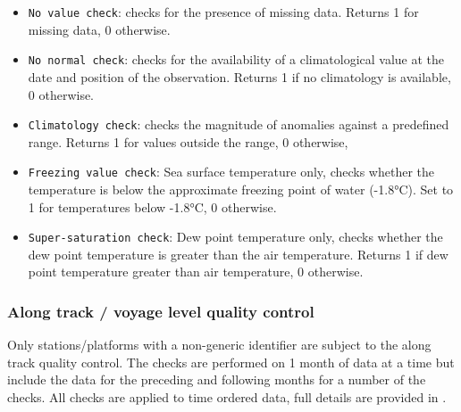 \begin{itemize}[resume]
\item \texttt{No value check}: checks for the presence of missing data. Returns 1 for missing data, 0 otherwise.
\item \texttt{No normal check}: checks for the availability of a climatological value at the date and position of the observation. Returns 1 if no climatology is available, 0 otherwise.
\item \texttt{Climatology check}: checks the magnitude of anomalies against a predefined range. Returns 1 for values outside the range, 0 otherwise,
\item \texttt{Freezing value check}: Sea surface temperature only, checks whether the temperature is below the approximate freezing point of water (-1.8°C). Set to 1 for temperatures below -1.8°C, 0 otherwise. 
\item \texttt{Super-saturation check}: Dew point temperature only, checks whether the dew point temperature is greater than the air temperature. Returns 1 if dew point temperature greater than air temperature, 0 otherwise.
\end{itemize}

\FloatBarrier
\subsubsection{Along track / voyage level quality control} \label{track-qc}
Only stations/platforms with a non-generic identifier are subject to the along track quality control. The checks are performed on 1 month of data at a time but include the data for the preceding and following months for a number of the checks. All checks are applied to time ordered data, full details are provided in \cite{Kennedy2019}.

